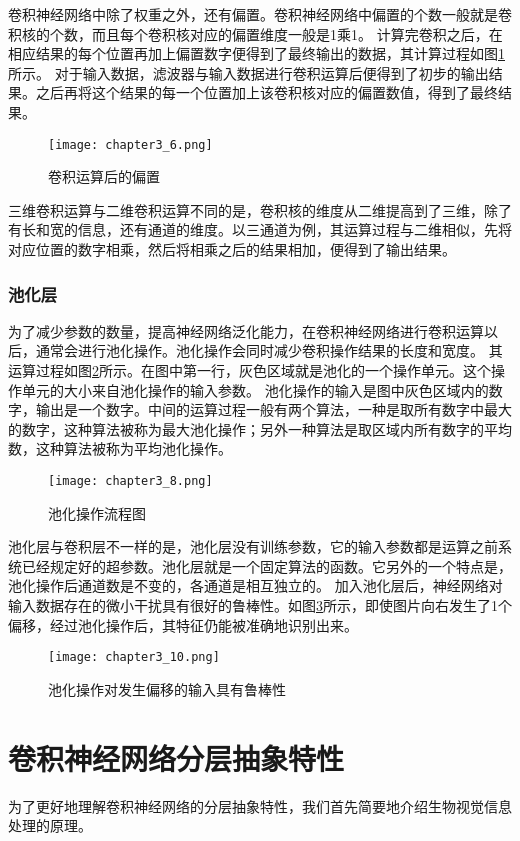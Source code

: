 卷积神经网络中除了权重之外，还有偏置。卷积神经网络中偏置的个数一般就是卷积核的个数，而且每个卷积核对应的偏置维度一般是1乘1。
计算完卷积之后，在相应结果的每个位置再加上偏置数字便得到了最终输出的数据，其计算过程如图\ref{fig:chapter3_6}所示。
对于输入数据，滤波器与输入数据进行卷积运算后便得到了初步的输出结果。之后再将这个结果的每一个位置加上该卷积核对应的偏置数值，得到了最终结果。
\begin{figure}
    \centering
    \texttt{[image: chapter3\_6.png]}
    \caption{卷积运算后的偏置}
    \label{fig:chapter3_6}
\end{figure}

三维卷积运算与二维卷积运算不同的是，卷积核的维度从二维提高到了三维，除了有长和宽的信息，还有通道的维度。以三通道为例，其运算过程与二维相似，先将对应位置的数字相乘，然后将相乘之后的结果相加，便得到了输出结果。

\subsubsection{池化层}
为了减少参数的数量，提高神经网络泛化能力，在卷积神经网络进行卷积运算以后，通常会进行池化操作。池化操作会同时减少卷积操作结果的长度和宽度。
其运算过程如图\ref{fig:chapter3_8}所示。在图中第一行，灰色区域就是池化的一个操作单元。这个操作单元的大小来自池化操作的输入参数。
池化操作的输入是图中灰色区域内的数字，输出是一个数字。中间的运算过程一般有两个算法，一种是取所有数字中最大的数字，这种算法被称为最大池化操作；另外一种算法是取区域内所有数字的平均数，这种算法被称为平均池化操作。
\begin{figure}
    \centering
    \texttt{[image: chapter3\_8.png]}
    \caption{池化操作流程图}
    \label{fig:chapter3_8}
\end{figure}

池化层与卷积层不一样的是，池化层没有训练参数，它的输入参数都是运算之前系统已经规定好的超参数。池化层就是一个固定算法的函数。它另外的一个特点是，池化操作后通道数是不变的，各通道是相互独立的。
加入池化层后，神经网络对输入数据存在的微小干扰具有很好的鲁棒性。如图\ref{fig:chapter3_10}所示，即使图片向右发生了1个偏移，经过池化操作后，其特征仍能被准确地识别出来。
\begin{figure}
    \centering
    \texttt{[image: chapter3\_10.png]}
    \caption{池化操作对发生偏移的输入具有鲁棒性}
    \label{fig:chapter3_10}
\end{figure}

\section{卷积神经网络分层抽象特性}
为了更好地理解卷积神经网络的分层抽象特性，我们首先简要地介绍生物视觉信息处理的原理。
